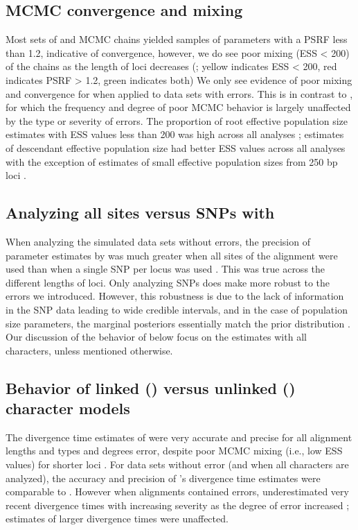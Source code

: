 \subsection{MCMC convergence and mixing}
Most sets of \beast and \ecoevolity MCMC chains yielded samples of parameters with
a PSRF less than 1.2, indicative of convergence,
however, we do see poor mixing (ESS < 200) of the \beast chains as the length
of loci decreases (\mainfigs;
yellow indicates ESS < 200, red indicates PSRF > 1.2, green indicates both)
We only see evidence of poor mixing and convergence for \ecoevolity when
applied to data sets with errors.
This is in contrast to \beast, for which the frequency and degree of poor MCMC
behavior is largely unaffected by the type or severity of errors.
The proportion of \beast root effective population size estimates with ESS 
values less than 200 was high across all analyses \rootfigsp;
estimates of descendant effective population size had better ESS values across all 
analyses with the exception of estimates of small effective population sizes from 
250 bp loci \thetafigsp.

\subsection{Analyzing all sites versus SNPs with \ecoevolity}
When analyzing the simulated data sets without errors, the precision of
parameter estimates by \ecoevolity was much greater when all sites of the
alignment were used than when a single SNP per locus was used \mainfigsp.
This was true across the different lengths of loci.
Only analyzing SNPs does make \ecoevolity more robust to the errors
we introduced.
However, this robustness is due to the lack of information in the
SNP data leading to wide credible intervals, and in the case of
population size parameters, the marginal posteriors essentially
match the prior distribution \thetafigsp.
Our discussion of the behavior of \ecoevolity below focus on the estimates with
all characters, unless mentioned otherwise.

\subsection{Behavior of linked (\beast) versus unlinked (\ecoevolity) character
    models}
The divergence time estimates of \beast were very accurate and precise for all
alignment lengths and types and degrees error, despite poor MCMC mixing (i.e.,
low ESS values) for shorter loci \timefigsp. 
For data sets without error (and when all characters are analyzed), the
accuracy and precision of \ecoevolity's divergence time estimates were
comparable to \beast \timefigsp.
However when alignments contained errors, \ecoevolity underestimated very
recent divergence times with increasing severity as the degree of error
increased \timefigsp; estimates of larger divergence times were unaffected.

